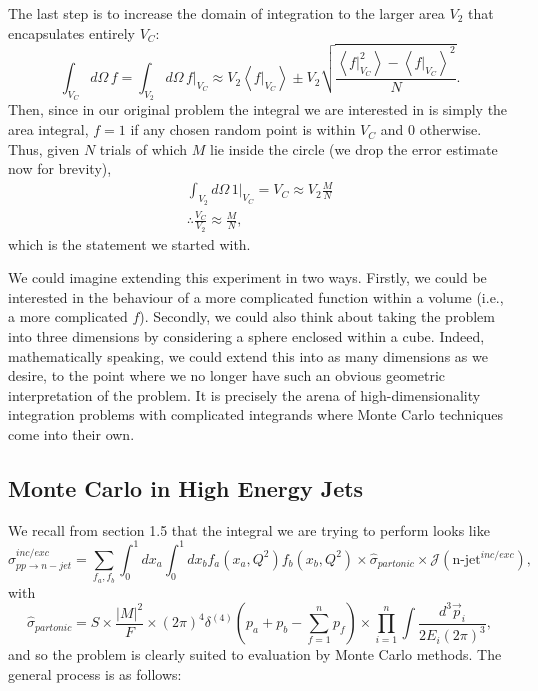 The last step is to increase the domain of integration to the larger area $V_2$ that encapsulates entirely $V_C$:
\begin{equation}
\int_{V_C} d \Omega \hspace{2pt} f  = \int_{V_2} d \Omega \hspace{2pt} f|_{V_C} \approx V_2 \left< f|_{V_C}  \right> \pm V_2 \sqrt{\frac{\left< f|_{V_C} ^2 \right> - \left< f|_{V_C}  \right>^2}{N}}.
\end{equation}
Then, since in our original problem the integral we are interested in is simply the area integral, $f = 1$ if any chosen random point is within $V_C$ and $0$ otherwise. Thus, given $N$ trials of which $M$ lie inside the circle (we drop the error estimate now for brevity),
\begin{equation}
\begin{split}
\int_{V_2} d \Omega \hspace{2pt} 1|_{V_C} = V_C \approx V_2 \frac{M}{N} \\
\therefore \frac{V_C}{V_2} \approx \frac{M}{N},
\end{split}
\end{equation}
which is the statement we started with. 

We could imagine extending this experiment in two ways. Firstly, we could be interested in the behaviour of a more complicated function within a volume (i.e., a more complicated $f$). Secondly, we could also think about taking the problem into three dimensions by considering a sphere enclosed within a cube. Indeed, mathematically speaking, we could extend this into as many dimensions as we desire, to the point where we no longer have such an obvious geometric interpretation of the problem. It is precisely the arena of high-dimensionality integration problems with complicated integrands where Monte Carlo techniques come into their own.

\subsection{Monte Carlo in High Energy Jets}

We recall from section 1.5 that the integral we are trying to perform looks like
\begin{equation}
\sigma_{pp \to n-jet}^{inc/exc} = \sum_{f_a, f_b} \int_0^1 dx_a \int_0^1 dx_b f_a(x_a, Q^2) f_b(x_b, Q^2) \times \hat{\sigma}_{partonic} \times \mathcal{J}(\text{n-jet}^{inc/exc}),
\end{equation}
with
\begin{equation}
\hat{\sigma}_{partonic} = S \times \frac{|M|^2}{F} \times (2 \pi)^4 \delta^{(4)}(p_a + p_b - \sum_{f=1}^n p_f) \times \prod_{i=1}^n \int \frac{d^3 \vec{p}_i}{2 E_i (2 \pi)^3},
\end{equation}
and so the problem is clearly suited to evaluation by Monte Carlo methods. The general process is as follows:

